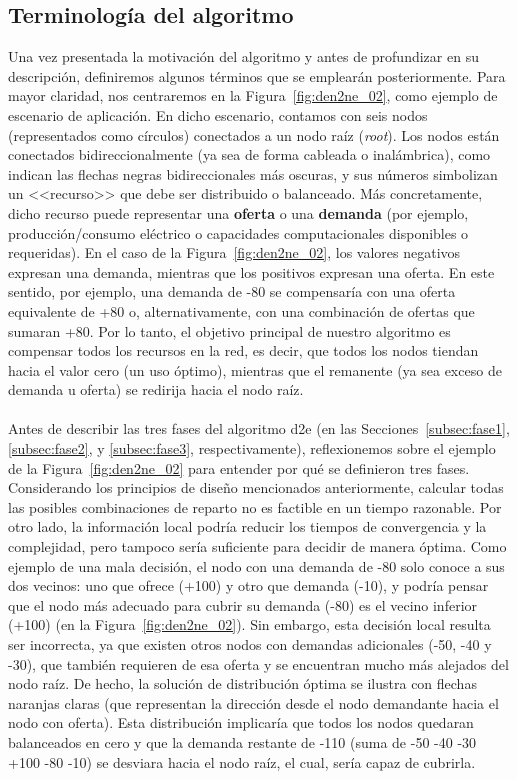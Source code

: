 \subsection{Terminología del algoritmo}
\label{subsec:terminologiaDEN2NE}
Una vez presentada la motivación del algoritmo y antes de profundizar en su descripción, definiremos algunos términos que se emplearán posteriormente. Para mayor claridad, nos centraremos en la Figura~\ref{fig:den2ne_02}, como ejemplo de escenario de aplicación. En dicho escenario, contamos con seis nodos (representados como círculos) conectados a un nodo raíz (\textit{root}). Los nodos están conectados bidireccionalmente (ya sea de forma cableada o inalámbrica), como indican las flechas negras bidireccionales más oscuras, y sus números simbolizan un <<recurso>> que debe ser distribuido o balanceado. Más concretamente, dicho recurso puede representar una \textbf{oferta} o una \textbf{demanda} (por ejemplo, producción/consumo eléctrico o capacidades computacionales disponibles o requeridas). En el caso de la Figura~\ref{fig:den2ne_02}, los valores negativos expresan una demanda, mientras que los positivos expresan una oferta. En este sentido, por ejemplo, una demanda de -80 se compensaría con una oferta equivalente de +80 o, alternativamente, con una combinación de ofertas que sumaran +80. Por lo tanto, el objetivo principal de nuestro algoritmo es compensar todos los recursos en la red, es decir, que todos los nodos tiendan hacia el valor cero (un uso óptimo), mientras que el remanente (ya sea exceso de demanda u oferta) se redirija hacia el nodo raíz. \\
\\
Antes de describir las tres fases del algoritmo \gls{d2e} (en las Secciones~\ref{subsec:fase1}, \ref{subsec:fase2}, y \ref{subsec:fase3}, respectivamente), reflexionemos sobre el ejemplo de la Figura~\ref{fig:den2ne_02} para entender por qué se definieron tres fases. Considerando los principios de diseño mencionados anteriormente, calcular todas las posibles combinaciones de reparto no es factible en un tiempo razonable. Por otro lado, la información local podría reducir los tiempos de convergencia y la complejidad, pero tampoco sería suficiente para decidir de manera óptima. Como ejemplo de una mala decisión, el nodo con una demanda de -80 solo conoce a sus dos vecinos: uno que ofrece (+100) y otro que demanda (-10), y podría pensar que el nodo más adecuado para cubrir su demanda (-80) es el vecino inferior (+100) (en la Figura~\ref{fig:den2ne_02}). Sin embargo, esta decisión local resulta ser incorrecta, ya que existen otros nodos con demandas adicionales (-50, -40 y -30), que también requieren de esa oferta y se encuentran mucho más alejados del nodo raíz. De hecho, la solución de distribución óptima se ilustra con flechas naranjas claras (que representan la dirección desde el nodo demandante hacia el nodo con oferta). Esta distribución implicaría que todos los nodos quedaran balanceados en cero y que la demanda restante de -110 (suma de -50 -40 -30 +100 -80 -10) se desviara hacia el nodo raíz, el cual, sería capaz de cubrirla.


